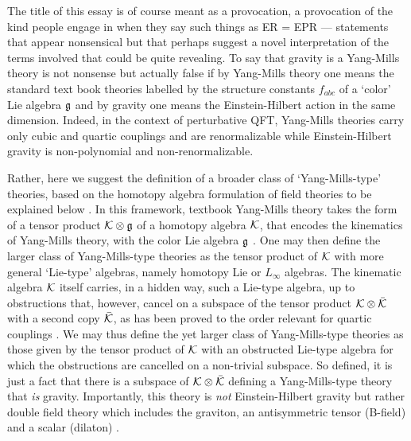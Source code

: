 \documentclass[12pt]{article}\pdfoutput=1
\begin{document}





\setcounter{equation}{0}


The title of this essay is of course meant as a provocation, a provocation of the kind people engage in when 
they say such things as  ER = EPR ---  statements that  
 appear nonsensical  but that perhaps suggest a 
novel interpretation of the terms involved that could be quite revealing. To say that gravity is a Yang-Mills theory 
is not nonsense  but actually  false if by Yang-Mills theory one means the standard text book theories 
labelled by the structure constants $f_{abc}$ of a `color' Lie algebra $\frak{g}$ and by gravity one means the Einstein-Hilbert 
action in the same dimension. 
Indeed, in the context of perturbative QFT, Yang-Mills theories carry only cubic and quartic couplings and are renormalizable 
while Einstein-Hilbert gravity is non-polynomial and non-renormalizable. 

Rather, here we suggest the definition of a broader class of `Yang-Mills-type' theories, based on the homotopy algebra 
formulation of field theories to be explained below \cite{Zwiebach:1992ie,Lada:1992wc,Hohm:2017pnh}. 
In this framework, textbook Yang-Mills theory takes the form of a tensor product ${\cal K}\otimes \frak{g}$ 
of a homotopy  algebra ${\cal K}$, that encodes the kinematics of Yang-Mills theory, 
with the color  Lie algebra $\frak{g}$ \cite{Zeitlin:2008cc}. 
One may then define the larger  class of  Yang-Mills-type theories as  the tensor product of ${\cal K}$ with more general `Lie-type' algebras, namely homotopy Lie or $L_{\infty}$ algebras. 
The kinematic algebra ${\cal K}$ itself carries, in a hidden way,  such a Lie-type algebra, up to obstructions that, however, 
cancel on a subspace  of the tensor product ${\cal K}\otimes \bar{\cal K}$ with a second copy $\bar{\cal K}$, 
as has been proved  to the order relevant for 
quartic couplings \cite{Bonezzi:2022bse,Bonezzi:2022yuh,Diaz-Jaramillo:2021wtl}. 
We may thus define the yet larger  class of Yang-Mills-type theories as those given by the tensor product of ${\cal K}$
with an obstructed Lie-type algebra for which the obstructions are  cancelled on a  non-trivial subspace. 
So defined, it is just a fact  that there is a  subspace of ${\cal K}\otimes \bar{\cal K}$ defining a Yang-Mills-type theory that 
\textit{is} gravity. Importantly, this theory  is \textit{not} Einstein-Hilbert gravity but rather double field theory which 
 includes the graviton, an antisymmetric tensor (B-field) and a scalar (dilaton) \cite{Hull:2009mi,Siegel:1993th,Hohm:2010pp}. 
\end{document}
